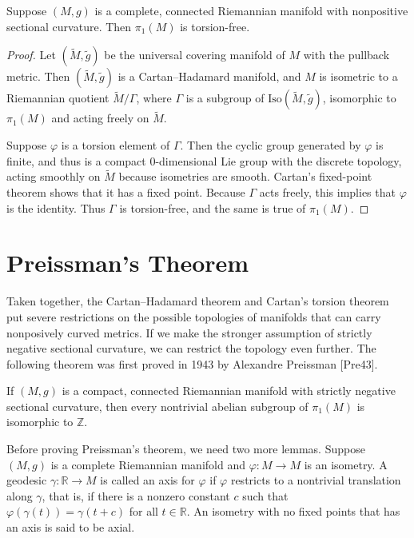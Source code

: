 \begin{corollary}
\label{cor:cartans-torsion-theorem}
Suppose $(M,g)$ is a complete, connected Riemannian manifold with nonpositive sectional curvature. Then $\pi_1(M)$ is torsion-free.
\end{corollary}

\begin{proof}
Let $(\tilde{M}, \tilde{g})$ be the universal covering manifold of $M$ with the pullback metric. Then $(\tilde{M}, \tilde{g})$ is a Cartan--Hadamard manifold, and $M$ is isometric to a Riemannian quotient $\tilde{M}/\Gamma$, where $\Gamma$ is a subgroup of $\text{Iso}(\tilde{M}, \tilde{g})$, isomorphic to $\pi_1(M)$ and acting freely on $\tilde{M}$.

Suppose $\varphi$ is a torsion element of $\Gamma$. Then the cyclic group generated by $\varphi$ is finite, and thus is a compact 0-dimensional Lie group with the discrete topology, acting smoothly on $\tilde{M}$ because isometries are smooth. Cartan's fixed-point theorem shows that it has a fixed point. Because $\Gamma$ acts freely, this implies that $\varphi$ is the identity. Thus $\Gamma$ is torsion-free, and the same is true of $\pi_1(M)$.
\end{proof}

\section{Preissman's Theorem}

Taken together, the Cartan--Hadamard theorem and Cartan's torsion theorem put severe restrictions on the possible topologies of manifolds that can carry nonposively curved metrics. If we make the stronger assumption of strictly negative sectional curvature, we can restrict the topology even further. The following theorem was first proved in 1943 by Alexandre Preissman [Pre43].

\begin{theorem}[Preissman]
\label{thm:preissman-theorem}
If $(M, g)$ is a compact, connected Riemannian manifold with strictly negative sectional curvature, then every nontrivial abelian subgroup of $\pi_1(M)$ is isomorphic to $\mathbb{Z}$.
\end{theorem}

Before proving Preissman's theorem, we need two more lemmas. Suppose $(M, g)$ is a complete Riemannian manifold and $\varphi : M \to M$ is an isometry. A geodesic $\gamma : \mathbb{R} \to M$ is called an axis for $\varphi$ if $\varphi$ restricts to a nontrivial translation along $\gamma$, that is, if there is a nonzero constant $c$ such that $\varphi(\gamma(t)) = \gamma(t + c)$ for all $t \in \mathbb{R}$. An isometry with no fixed points that has an axis is said to be axial.

